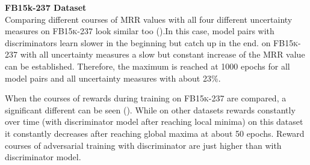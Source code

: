 \textbf{FB15k-237 Dataset}
\label{subsubsec:measures_fb15k237}\\
%
Comparing different courses of MRR values with all four different uncertainty measures on \textsc{FB15k-237} look similar too ().In this case, model pairs with \transd discriminators learn slower in the beginning but catch up in the end.
on \textsc{FB15k-237} with all uncertainty measures a slow but constant increase of the MRR value can be established.
Therefore, the maximum is reached at 1000 epochs for all model pairs and all uncertainty measures with about 23\%.

When the courses of rewards during training on \textsc{FB15k-237} are compared, a significant different can be seen ().
While on other datasets rewards constantly over time (with \transd discriminator model after reaching local minima) on this dataset it constantly decreases after reaching global maxima at about 50 epochs.
Reward courses of adversarial training with \transe discriminator are just higher than with \transd discriminator model.
